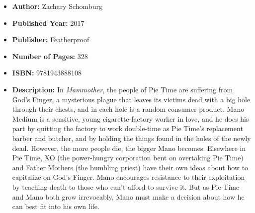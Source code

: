 \documentclass{tufte-handout}
\begin{document}
\begin{itemize}
    \item[] \textbf{Author:} Zachary Schomburg 
    \item[] \textbf{Published Year:} 2017
    \item[] \textbf{Publisher:} Featherproof
    \item[] \textbf{Number of Pages:} 328    
    \item[] \textbf{ISBN:} 9781943888108
    \item[] \textbf{Description:} In \textit{Mammother}, the people of Pie Time are suffering from God’s Finger, a mysterious plague that leaves its victims dead with a big hole through their chests, and in each hole is a random consumer product. Mano Medium is a sensitive, young cigarette-factory worker in love, and he does his part by quitting the factory to work double-time as Pie Time’s replacement barber and butcher, and by holding the things found in the holes of the newly dead. However, the more people die, the bigger Mano becomes. Elsewhere in Pie Time, XO (the power-hungry corporation bent on overtaking Pie Time) and Father Mothers (the bumbling priest) have their own ideas about how to capitalize on God’s Finger. Mano encourages resistance to their exploitation by teaching death to those who can’t afford to survive it. But as Pie Time and Mano both grow irrevocably, Mano must make a decision about how he can best fit into his own life.
\end{itemize}
\end{document}
